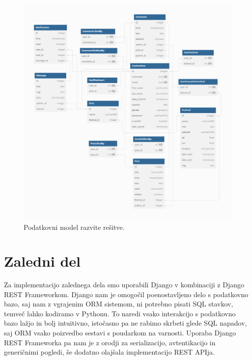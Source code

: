 \documentclass[a4paper,12pt,openright]{book}
\begin{document}
\begin{figure}[p] %
\begin{center}
\includegraphics[width=\textwidth]{img/baza}
\end{center}
\caption{Podatkovni model razvite rešitve.}
\label{baza}
\end{figure}

\section{Zaledni del}
Za implementacijo zalednega dela smo uporabili Django v kombinaciji z Django REST Frameworkom.
Django nam je omogočil poenostavljeno delo s podatkovno bazo, saj nam z vgrajenim ORM sistemom, ni potrebno pisati SQL stavkov, temveč lahko kodiramo v Pythonu.
To naredi vsako interakcijo s podatkovno bazo lažjo in bolj intuitivno, istočasno pa ne rabimo skrbeti glede SQL napadov, saj ORM vsako poizvedbo sestavi s poudarkom na varnosti. 
Uporaba Django REST Frameworka pa nam je z orodji za serializacijo, avtentikacijo in generičnimi pogledi, še dodatno olajšala implementacijo REST APIja.

\end{document}
